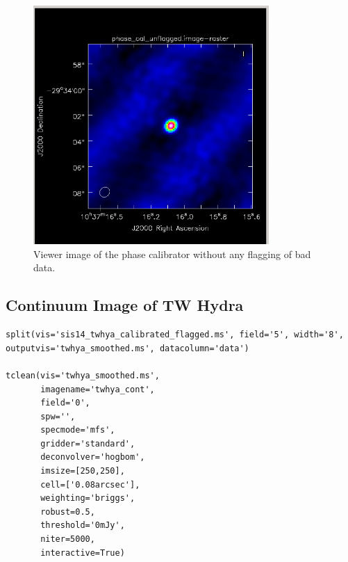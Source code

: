 \begin{figure}[H]
       \centering
       \includegraphics[width=0.8\textwidth]{Images/unflagged-image.png}
       \caption{Viewer image of the phase calibrator without any flagging of bad data.}
\end{figure}

\clearpage

\subsection{Continuum Image of TW Hydra}

\begin{lstlisting}[style=casa-python]
split(vis='sis14_twhya_calibrated_flagged.ms', field='5', width='8', outputvis='twhya_smoothed.ms', datacolumn='data')

tclean(vis='twhya_smoothed.ms',
       imagename='twhya_cont',
       field='0',
       spw='',
       specmode='mfs',
       gridder='standard',
       deconvolver='hogbom',
       imsize=[250,250],
       cell=['0.08arcsec'],
       weighting='briggs',
       robust=0.5,
       threshold='0mJy',
       niter=5000,
       interactive=True)
\end{lstlisting}

